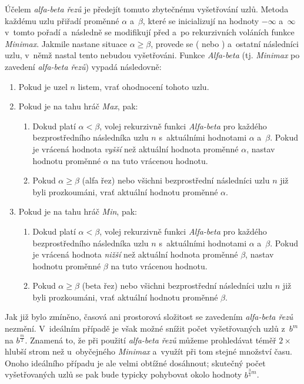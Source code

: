 Účelem \emph{alfa-beta řezů} je předejít tomuto zbytečnému vyšetřování uzlů. Metoda každému uzlu přiřadí proměnné $\alpha$ a~$\beta$, které se inicializují na hodnoty $-\infty$ a~$\infty$ v~tomto pořadí a~následně se modifikují před a~po rekurzivních voláních funkce \emph{Minimax}. Jakmile nastane situace $\alpha \geq \beta$, provede se  ( nebo ) a~ostatní následníci uzlu, v~němž nastal tento  nebudou vyšetřováni. Funkce \emph{Alfa-beta} (tj. \emph{Minimax} po zavedení \emph{alfa-beta řezů}) vypadá následovně:
\begin{enumerate}
    \item Pokud je uzel $n$ listem, vrať ohodnocení tohoto uzlu.
    \item Pokud je na tahu hráč \emph{Max}, pak:
    \begin{enumerate}
        \item Dokud platí $\alpha < \beta$, volej rekurzivně funkci \emph{Alfa-beta} pro každého bezprostředního následníka uzlu $n$ s~aktuálními hodnotami $\alpha$ a~$\beta$. Pokud je vrácená hodnota \emph{vyšší} než aktuální hodnota proměnné $\alpha$, nastav hodnotu proměnné $\alpha$ na tuto vrácenou hodnotu.
        \item Pokud $\alpha \geq \beta$ (alfa řez) nebo všichni bezprostřední následníci uzlu $n$ již byli prozkoumáni, vrať aktuální hodnotu proměnné $\alpha$.
    \end{enumerate}
    \item Pokud je na tahu hráč \emph{Min}, pak:
    \begin{enumerate}
        \item Dokud platí $\alpha < \beta$, volej rekurzivně funkci \emph{Alfa-beta} pro každého bezprostředního následníka uzlu $n$ s~aktuálními hodnotami $\alpha$ a~$\beta$. Pokud je vrácená hodnota \emph{nižší} než aktuální hodnota proměnné $\beta$, nastav hodnotu proměnné $\beta$ na tuto vrácenou hodnotu.
        \item Pokud $\alpha \geq \beta$ (beta řez) nebo všichni bezprostřední následníci uzlu $n$ již byli prozkoumáni, vrať aktuální hodnotu proměnné $\beta$.
    \end{enumerate}
\end{enumerate}

Jak již bylo zmíněno, časová ani prostorová složitost se zavedením \emph{alfa-beta řezů} nezmění. V~ideálním případě je však možné snížit počet vyšetřovaných uzlů z~$b^m$ na $b^\frac{m}{2}$. Znamená to, že při použití \emph{alfa-beta řezů} můžeme prohledávat téměř $2\times$ hlubší strom než u~obyčejného \emph{Minimax} a~využít při tom stejné množství času. Onoho ideálního případu je ale velmi obtížné dosáhnout; skutečný počet vyšetřovaných uzlů se pak bude typicky pohybovat okolo hodnoty $b^{\frac{3}{4}m}$.

